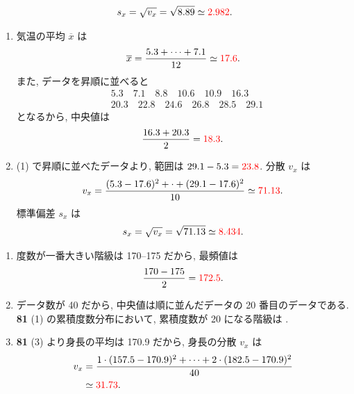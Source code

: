 \begin{qenumerate}
{\begin{enumerate}
{\begin{align}
					s_{x} = \sqrt{v_{x}} = \sqrt{8.89} \simeq \textcolor{red}{2.982}.
				\end{align}
			}
		\end{enumerate}
	}
	\item{
		\begin{enumerate}
			\item{
				気温の平均 $\overline{x}$ は
				\begin{align}
					\overline{x} = \frac{5.3 + \cdots + 7.1}{12} \simeq \textcolor{red}{17.6}.
				\end{align}
				また, データを昇順に並べると
				\begin{align}
					&5.3\quad 7.1\quad 8.8\quad 10.6\quad 10.9\quad 16.3 \\
					&20.3\quad 22.8\quad 24.6\quad 26.8\quad 28.5\quad 29.1
				\end{align}
				となるから, 中央値は
				\begin{align}
					\frac{16.3 + 20.3}{2} = \textcolor{red}{18.3}.
				\end{align}
			}
			\item{
				(1) で昇順に並べたデータより, 範囲は $29.1 - 5.3 = \textcolor{red}{23.8}$.
				分散 $v_{x}$ は
				\begin{align}
					v_{x} = \frac{(5.3 - 17.6)^{2} + \cdot + (29.1 - 17.6)^{2}}{10} \simeq \textcolor{red}{71.13}.
				\end{align}
				標準偏差 $s_{x}$ は
				\begin{align}
					s_{x} = \sqrt{v_{x}} = \sqrt{71.13} \simeq \textcolor{red}{8.434}.
				\end{align}
			}
		\end{enumerate}
	}
	\item{
		\begin{enumerate}
			\item{
				度数が一番大きい階級は 170--175 だから, 最頻値は
				\begin{align}
					\frac{170 - 175}{2} = \textcolor{red}{172.5}.
				\end{align}
			}
			\item{
				データ数が 40 だから, 中央値は順に並んだデータの 20 番目のデータである.
				{\textbf{81}} (1) の累積度数分布において, 累積度数が 20 になる階級は .
			}
			\item{
				{\textbf{81}} (3) より身長の平均は 170.9 だから, 身長の分散 $v_{x}$ は
				\begin{align}
					v_{x} &= \frac{1\cdot (157.5 - 170.9)^{2} + \cdots + 2\cdot (182.5 - 170.9)^{2}}{40} \\
						&\simeq \textcolor{red}{31.73}.
				\end{align}
}
\end{enumerate}}
\end{qenumerate}
